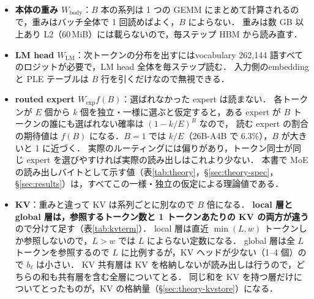 \documentclass[a4paper,10pt]{ltjsarticle}
\begin{document}
\begin{itemize}
\item \textbf{本体の重み $W_\text{body}$}：$B$ 本の系列は 1 つの GEMM にまとめて計算されるので，重みはバッチ全体で 1 回読めばよく，$B$ によらない．
      重みは数 GB 以上あり L2（60\,MiB）には載らないので，毎ステップ HBM から読み直す．
\item \textbf{LM head $W_\text{LM}$}：次トークンの分布を出すにはvocabulary 262{,}144 語すべてのロジットが必要で，LM head 全体を毎ステップ読む．
      入力側のembeddingと PLE テーブルは $B$ 行を引くだけなので無視できる．
\item \textbf{routed expert $W_\text{exp} f(B)$}：選ばれなかった expert は読まない．
      各トークンが $E$ 個から $k$ 個を独立・一様に選ぶと仮定すると，ある expert が $B$ トークンの誰にも選ばれない確率は $(1-k/E)^B$ なので，
      読む expert の割合の期待値は $f(B)$ になる．$B=1$ では $k/E$（26B-A4B で 6.3\%），$B$ が大きいと 1 に近づく．
      実際のルーティングには偏りがあり，トークン同士が同じ expert を選びやすければ実際の読み出しはこれより少ない．
      本書で MoE の読み出しバイトとして示す値（表\ref{tab:theory}，\S\ref{sec:theory-spec}，\S\ref{sec:results}）は，すべてこの一様・独立の仮定による理論値である．
\item \textbf{KV}：重みと違って KV は系列ごとに別なので $B$ 倍になる．
      \textbf{local 層と global 層は，参照するトークン数と 1 トークンあたりの KV の両方が違う}ので分けて足す（表\ref{tab:kvterm}）．
      local 層は直近 $\min(L, w)$ トークンしか参照しないので，$L > w$ では $L$ によらない定数になる．
      global 層は全 $L$ トークンを参照するので $L$ に比例するが，KV ヘッドが少ない（1--4 個）ので $b_\ell$ は小さい．
      KV 共有層は KV を格納しないが読み出しは行うので，どちらの和も共有層を含む全層についてとる．
      同じ和を KV を持つ層だけについてとったものが，KV の格納量（\S\ref{sec:theory-kvstore}）になる．
\end{itemize}
\end{document}
